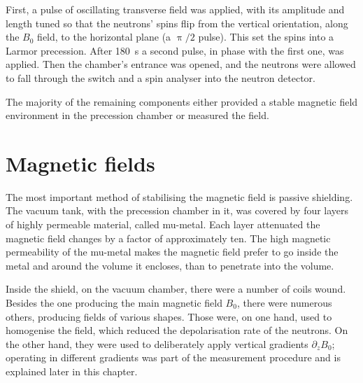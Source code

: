 First, a pulse of oscillating transverse field was applied, with its amplitude and length tuned so that the neutrons' spins flip from the vertical orientation, along the $B_0$ field, to the horizontal plane (a $\uppi/2$ pulse).
This set the spins into a Larmor precession.
After \SI{180}{\second} a second pulse, in phase with the first one, was applied. Then the chamber's entrance was opened, and the neutrons were allowed to fall through the switch and a spin analyser into the neutron detector.

The majority of the remaining components either provided a stable magnetic field environment in the precession chamber or measured the field.




\section{Magnetic fields}
The most important method of stabilising the magnetic field is passive shielding. The vacuum tank, with the precession chamber in it, was covered by four layers of highly permeable material, called mu-metal.
Each layer attenuated the magnetic field changes by a factor of approximately ten. The high magnetic permeability of the mu-metal makes the magnetic field prefer to go inside the metal and around the volume it encloses, than to penetrate into the volume. 

Inside the shield, on the vacuum chamber, there were a number of coils wound. 
Besides the one producing the main magnetic field $B_0$, there were numerous others, producing fields of various shapes.
Those were, on one hand, used to homogenise the field, which reduced the depolarisation rate of the neutrons. On the other hand, they were used to deliberately apply vertical gradients $\partial_z B_0$; operating in different gradients was part of the measurement procedure and is explained later in this chapter.

